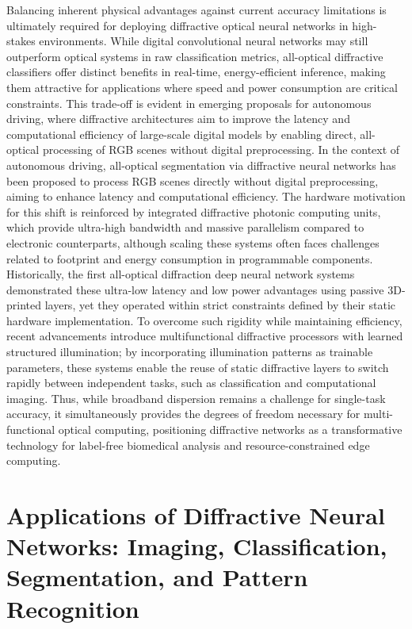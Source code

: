 Balancing inherent physical advantages against current accuracy limitations is ultimately required for deploying diffractive optical neural networks in high-stakes environments. While digital convolutional neural networks may still outperform optical systems in raw classification metrics, all-optical diffractive classifiers offer distinct benefits in real-time, energy-efficient inference, making them attractive for applications where speed and power consumption are critical constraints. This trade-off is evident in emerging proposals for autonomous driving, where diffractive architectures aim to improve the latency and computational efficiency of large-scale digital models by enabling direct, all-optical processing of RGB scenes without digital preprocessing. In the context of autonomous driving, all-optical segmentation via diffractive neural networks has been proposed to process RGB scenes directly without digital preprocessing, aiming to enhance latency and computational efficiency. \citep{doi_10_48550_arxiv_2602_07717_16cb1c7a} The hardware motivation for this shift is reinforced by integrated diffractive photonic computing units, which provide ultra-high bandwidth and massive parallelism compared to electronic counterparts, although scaling these systems often faces challenges related to footprint and energy consumption in programmable components. Historically, the first all-optical diffraction deep neural network systems demonstrated these ultra-low latency and low power advantages using passive 3D-printed layers, yet they operated within strict constraints defined by their static hardware implementation. To overcome such rigidity while maintaining efficiency, recent advancements introduce multifunctional diffractive processors with learned structured illumination; by incorporating illumination patterns as trainable parameters, these systems enable the reuse of static diffractive layers to switch rapidly between independent tasks, such as classification and computational imaging. Thus, while broadband dispersion remains a challenge for single-task accuracy, it simultaneously provides the degrees of freedom necessary for multi-functional optical computing, positioning diffractive networks as a transformative technology for label-free biomedical analysis and resource-constrained edge computing. \citep{doi_10_1364_ol_593231_ab93febc} \citep{doi_10_48550_arxiv_2602_07717_16cb1c7a} \citep{doi_10_1038_s41467_022_28702_0_1b79b43c} \citep{doi_10_1364_josab_497148_b087424b} \citep{doi_10_1364_ol_591818_8738c4b1}

\section{Applications of Diffractive Neural Networks: Imaging, Classification, Segmentation, and Pattern Recognition}\label{applications-of-diffractive-neural-networks-imaging-classification-segmentation-and-pattern-recognition}


